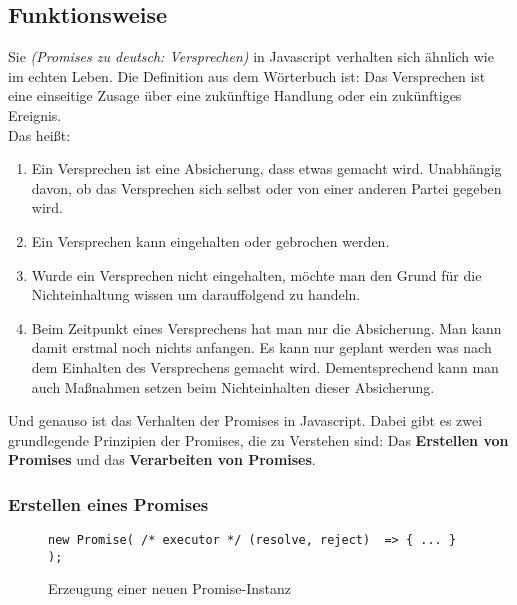 \subsection{Funktionsweise}

\noindent
Sie \textit{(\glqq{}Promises\grqq{} zu deutsch: Versprechen)} in Javascript verhalten sich ähnlich wie im echten Leben. Die Definition aus dem Wörterbuch ist: Das Versprechen ist eine einseitige Zusage über eine zukünftige Handlung oder ein zukünftiges Ereignis. \cite{versprechen} \\

\noindent
Das heißt:

\begin{enumerate}
    \item Ein Versprechen ist eine Absicherung, dass etwas gemacht wird. Unabhängig davon, ob das Versprechen sich selbst oder von einer anderen Partei gegeben wird.
    
    \item Ein Versprechen kann eingehalten oder gebrochen werden.
    
    \item Wurde ein Versprechen nicht eingehalten, möchte man den Grund für die Nichteinhaltung wissen um darauffolgend zu handeln.
    
    \item Beim Zeitpunkt eines Versprechens hat man nur die Absicherung. Man kann damit erstmal noch nichts anfangen. Es kann nur geplant werden was nach dem Einhalten des Versprechens gemacht wird. Dementsprechend kann man auch Maßnahmen setzen beim Nichteinhalten dieser Absicherung.
    
\end{enumerate}

\noindent
Und genauso ist das Verhalten der Promises in Javascript. Dabei gibt es zwei grundlegende Prinzipien der Promises, die zu Verstehen sind: Das \textbf{Erstellen von Promises} und das \textbf{Verarbeiten von Promises}.

\subsubsection{Erstellen eines Promises}

\begin{figure}[H]
\begin{lstlisting}
new Promise( /* executor */ (resolve, reject)  => { ... } );
\end{lstlisting}
\caption{Erzeugung einer neuen Promise-Instanz}
\end{figure}

